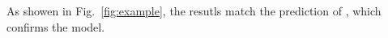 As showen in Fig.~\ref{fig:example}, the resutls match the prediction of \cite{zhang2020}, which confirms the model.
